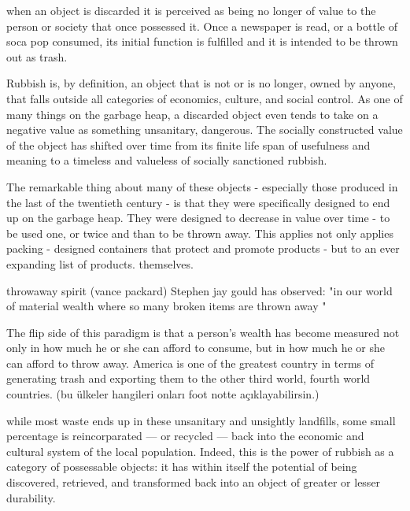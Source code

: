  when an object is discarded it is perceived as being no longer of value to the person or society that once possessed it. Once a newspaper is read, or a bottle of soca pop consumed, its initial function is fulfilled and it is intended to be thrown out as trash.

 Rubbish is, by definition, an object that is not or is no longer, owned by anyone, that falls outside all categories of economics, culture, and social control. As one of many things on the garbage heap, a discarded object even tends to take on a negative value as something unsanitary, dangerous. The socially constructed value of the object has shifted over time from its finite life span of usefulness and meaning to a timeless and valueless of socially sanctioned rubbish. 

 The remarkable thing about many of these objects - especially those produced in the last of the twentieth century - is that they were specifically designed to end up on the garbage heap. They were designed to decrease in value over time - to be used one, or twice and than to be thrown away. This applies not only applies packing - designed containers that protect and promote products - but to an ever expanding list of products. themselves. 

 throwaway spirit (vance packard) Stephen jay gould has observed: "in our world of material wealth where so many broken items are thrown away "

 The flip side of this paradigm is that a person's wealth has become measured not only in how much he or she can afford to consume, but in how much he or she can afford to throw away. America is one of the greatest country in terms of generating trash and exporting them to the other third world, fourth world countries. (bu ülkeler hangileri onları foot notte açıklayabilirsin.)

 while most waste ends up in these unsanitary and unsightly landfills, some small percentage is reincorparated --- or recycled --- back into the economic and cultural system of the local population. Indeed, this is the power of rubbish as a category of possessable objects: it has within itself the potential of being discovered, retrieved, and transformed back into an object of greater or lesser durability. 

